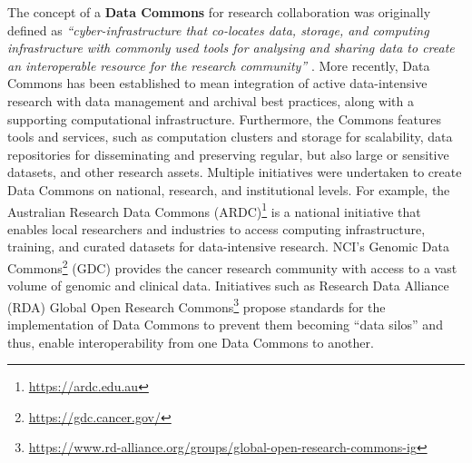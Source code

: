 \documentclass[ds,v1.1.2,openaccess]{iosart2x}%
\begin{document}
The concept of a \textbf{Data Commons} for research collaboration was
originally defined as \textit{``cyber-infrastructure that co-locates data,
storage, and computing infrastructure with commonly used tools for
analysing and sharing data to create an interoperable resource for the
research community''} \cite{doi:10.1109/MCSE.2016.92}. More recently, Data
Commons has been established to mean integration of active
data-intensive research with data management and archival best
practices, along with a supporting computational infrastructure.
Furthermore, the Commons features tools and services, such as
computation clusters and storage for scalability, data repositories for
disseminating and preserving regular, but also large or sensitive
datasets, and other research assets. Multiple initiatives were
undertaken to create Data Commons on national, research, and
institutional levels. For example, the Australian Research Data
Commons (ARDC)\footnote{\url{https://ardc.edu.au}} \cite{doi:10.5334/dsj-2019-044} is a
national initiative that enables local researchers and industries to
access computing infrastructure, training, and curated datasets for
data-intensive research. NCI's Genomic Data
Commons\footnote{\url{https://gdc.cancer.gov/}} (GDC)
\cite{doi:10.1182/blood-2017-03-735654} provides the cancer research
community with access to a vast volume of genomic and clinical data.
Initiatives such as Research Data Alliance (RDA) Global Open Research
Commons\footnote{\url{https://www.rd-alliance.org/groups/global-open-research-commons-ig}}
propose standards for the implementation of Data Commons to prevent
them becoming ``data silos'' and thus, enable interoperability from one
Data Commons to another.
\end{document}
